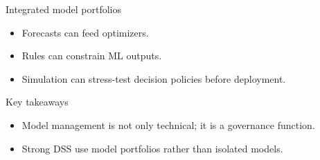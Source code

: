 \documentclass[aspectratio=169,11pt]{beamer}
\begin{document}
\begin{frame}{Integrated model portfolios}
  \begin{itemize}
    \item Forecasts can feed optimizers.
    \item Rules can constrain ML outputs.
    \item Simulation can stress-test decision policies before deployment.
  \end{itemize}
\end{frame}


\begin{frame}{Key takeaways}
  \begin{itemize}
    \item Model management is not only technical; it is a governance function.
    \item Strong DSS use model portfolios rather than isolated models.
  \end{itemize}
\end{frame}
\end{document}
